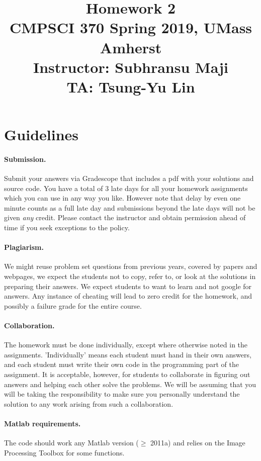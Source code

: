 \documentclass[10pt,letterpaper]{article}
\title{
  Homework 2 \\
  \Large{CMPSCI 370 Spring 2019, UMass Amherst} \\
  \Large{Instructor: Subhransu Maji} \\
  \Large{TA: Tsung-Yu Lin}
}
\date{}
\begin{document}
\maketitle

\renewcommand\thesubsection{\thesection.\alph{subsection}}


\section*{Guidelines}

\paragraph{Submission.} Submit your answers via Gradescope that includes a pdf with your solutions and source code. You have a total of 3 late days for all your homework assignments which you can use in any way you like. However note that delay by even one minute counts as a full late day and submissions beyond the late days will not be given \emph{any} credit. Please contact the instructor and obtain permission ahead of time if you seek exceptions to the policy.

\paragraph{Plagiarism.} We might reuse problem set questions from previous years, covered by papers and webpages, we expect the students not to copy, refer to, or look at the solutions in preparing their answers. We expect students to want to learn and not google for answers. Any instance of cheating will lead to zero credit for the homework, and possibly a failure grade for the entire course.

\paragraph{Collaboration.} The homework must be done individually, except where otherwise noted in the assignments. 'Individually' means each student must hand in their own answers, and each student must write their own code in the programming part of the assignment. It is acceptable, however, for students to collaborate in figuring out answers and helping each other solve the problems. We will be assuming that you will be taking the responsibility to make sure you personally understand the solution to any work arising from such a collaboration.

\paragraph{Matlab requirements.} The code should work any Matlab version ($\geq$ 2011a) and relies on the Image Processing Toolbox for some functions.
\end{document}
